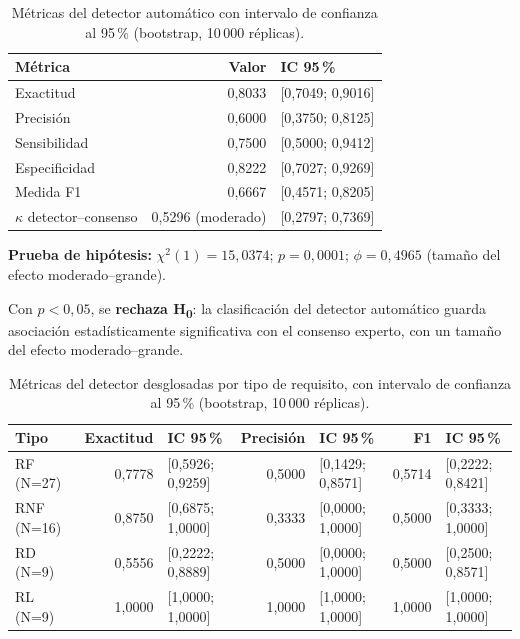 \documentclass[journal,onecolumn]{IEEEtran}
\begin{document}
\begin{table}[H]
	\centering
	\caption{Métricas del detector automático con intervalo de confianza al 95\,\% (bootstrap, 10\,000 réplicas).}
	\label{tab:metricas-detector}
	\begin{tabular}{@{}lrl@{}}
		\toprule
		\textbf{Métrica} & \textbf{Valor} & \textbf{IC 95\,\%} \\
		\midrule
		Exactitud & 0,8033 & [0,7049; 0,9016] \\
		Precisión & 0,6000 & [0,3750; 0,8125] \\
		Sensibilidad & 0,7500 & [0,5000; 0,9412] \\
		Especificidad & 0,8222 & [0,7027; 0,9269] \\
		Medida F1 & 0,6667 & [0,4571; 0,8205] \\
		$\kappa$ detector--consenso & 0,5296 (moderado) & [0,2797; 0,7369] \\
		\bottomrule
	\end{tabular}
\end{table}

\textbf{Prueba de hipótesis:} $\chi^2(1) = 15{,}0374$; $p = 0{,}0001$;
$\phi = 0{,}4965$ (tamaño del efecto moderado--grande).

Con $p < 0{,}05$, se \textbf{rechaza H\textsubscript{0}}: la clasificación
del detector automático guarda asociación estadísticamente significativa
con el consenso experto, con un tamaño del efecto moderado--grande.

\begin{table}[H]
	\centering
	\caption{Métricas del detector desglosadas por tipo de requisito, con intervalo de confianza al 95\,\% (bootstrap, 10\,000 réplicas).}
	\label{tab:metricas-por-categoria}
	\small
	\begin{tabular}{@{}lrlrlrl@{}}
		\toprule
		\textbf{Tipo} & \textbf{Exactitud} & \textbf{IC 95\,\%} & \textbf{Precisión} & \textbf{IC 95\,\%} & \textbf{F1} & \textbf{IC 95\,\%} \\
		\midrule
		RF (N=27) & 0,7778 & [0,5926; 0,9259] & 0,5000 & [0,1429; 0,8571] & 0,5714 & [0,2222; 0,8421] \\
		RNF (N=16) & 0,8750 & [0,6875; 1,0000] & 0,3333 & [0,0000; 1,0000] & 0,5000 & [0,3333; 1,0000] \\
		RD (N=9) & 0,5556 & [0,2222; 0,8889] & 0,5000 & [0,0000; 1,0000] & 0,5000 & [0,2500; 0,8571] \\
		RL (N=9) & 1,0000 & [1,0000; 1,0000] & 1,0000 & [1,0000; 1,0000] & 1,0000 & [1,0000; 1,0000] \\
		\bottomrule
	\end{tabular}
\end{table}
\end{document}
